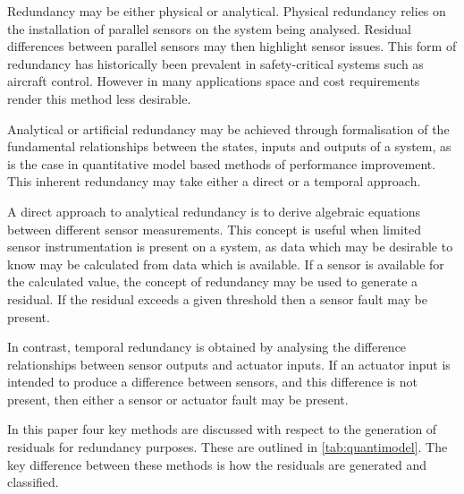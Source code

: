 Redundancy may be either physical or analytical. Physical redundancy relies on the installation of parallel sensors on the system being analysed. Residual differences between parallel sensors may then highlight sensor issues. This form of redundancy has historically been prevalent in safety-critical systems such as aircraft control. However in many applications space and cost requirements render this method less desirable.

Analytical or artificial redundancy may be achieved through formalisation of the fundamental relationships between the states, inputs and outputs of a system, as is the case in quantitative model based methods of performance improvement. This inherent redundancy may take either a direct or a temporal approach.

A direct approach to analytical redundancy is to derive algebraic equations between different sensor measurements. This concept is useful when limited sensor instrumentation is present on a system, as data which may be desirable to know may be calculated from data which is available. If a sensor is available for the calculated value, the concept of redundancy may be used to generate a residual. If the residual exceeds a given threshold then a sensor fault may be present.

In contrast, temporal redundancy is obtained by analysing the difference relationships between sensor outputs and actuator inputs. If an actuator input is intended to produce a difference between sensors, and this difference is not present, then either a sensor or actuator fault may be present.

In this paper four key methods are discussed with respect to the generation of residuals for redundancy purposes. These are outlined in \autoref{tab:quantimodel}. The key difference between these methods is how the residuals are generated and classified.


